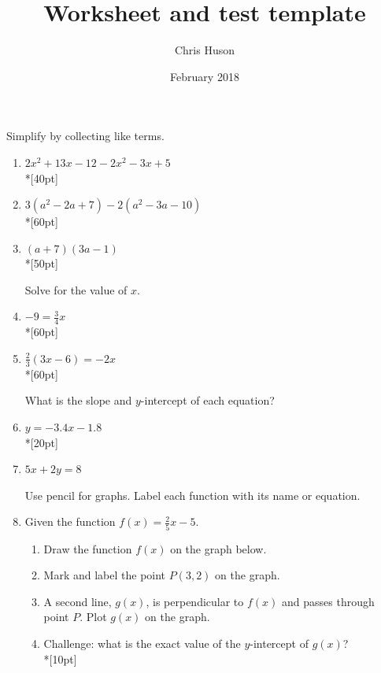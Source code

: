 \documentclass[12pt, oneside]{article}
\title{Worksheet and test template}
\author{Chris Huson}
\date{February 2018}
\begin{document}
Simplify by collecting like terms.

\begin{enumerate}


\item $2x^2+13x -12 -2x^2-3x+5$\\*[40pt]
\item $3(a^2-2a +7) -2(a^2-3a-10)$\\*[60pt]
\item $(a +7)(3a-1)$\\*[50pt]


Solve for the value of $x$.
\item   $-9= \frac{3}{4}x$\\*[60pt]
\item   $\frac{2}{3}(3x-6)=-2x$\\*[60pt]


What is the slope and $y$-intercept of each equation?
\item   $y=-3.4x-1.8$\\*[20pt]
\item   $5x+2y=8$

\newpage
Use pencil for graphs. Label each function with its name or equation.
\item Given the function $f(x)=\frac{2}{5}x-5$.
\begin{enumerate}
    \item Draw the function $f(x)$ on the graph below.
    \item Mark and label the point $P (3, 2)$ on the graph.
    \item A second line, $g(x)$, is perpendicular to $f(x)$ and passes through point $P$. Plot $g(x)$ on the graph.
    \item Challenge: what is the exact value of the $y$-intercept of $g(x)$?\\*[10pt]
\end{enumerate}


\end{enumerate}
\end{document}
